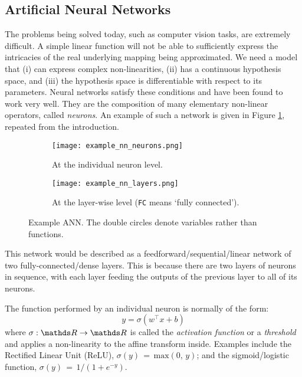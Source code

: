 \subsection{Artificial Neural Networks}
The problems being solved today, such as computer vision tasks, are extremely difficult.
A simple linear function will not be able to sufficiently express the intricacies of the real underlying mapping being approximated.
We need a model that (i) can express complex non-linearities, (ii) has a continuous hypothesis space, and (iii) the hypothesis space is differentiable with respect to its parameters.
Neural networks satisfy these conditions and have been found to work very well.
They are the composition of many elementary non-linear operators, called \textit{neurons}.
An example of such a network is given in Figure \ref{fig:2-example-net}, repeated from the introduction.
\begin{figure}[h]
    \centering
    \hspace{0.5cm}
    \begin{subfigure}[]{0.4\textwidth}
        \centering
        \texttt{[image: example\_nn\_neurons.png]}
        \caption{At the individual neuron level.}
    \end{subfigure}%
    \hfill
    \begin{subfigure}[]{0.4\textwidth}
        \centering
        \texttt{[image: example\_nn\_layers.png]}
        \caption{At the layer-wise level (\texttt{FC} means `fully connected').}
    \end{subfigure}%
    \hspace{0.5cm}
    \caption{Example ANN. The double circles denote variables rather than functions.}
    \label{fig:2-example-net}
\end{figure}
This network would be described as a feedforward/sequential/linear network of two fully-connected/dense layers.
This is because there are two layers of neurons in sequence, with each layer feeding the outputs of the previous layer to all of its neurons.

The function performed by an individual neuron is normally of the form:
\begin{equation*}
y = \sigma(w^\top x + b)
\end{equation*}
where \(\sigma : \R \rightarrow \R\) is called the \textit{activation function} or a \textit{threshold} and applies a non-linearity to the affine transform inside.
Examples include the Rectified Linear Unit (ReLU), \(\sigma(y) \,=\, \mathrm{max}(0,\, y)\);
and the sigmoid/logistic function, \(\sigma(y)\, =\, 1 / (1+e^{-y})\).

